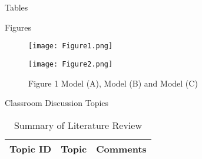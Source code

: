 \begin{frame}[t]
\begin{columns}[t]
\begin{column}{\onecolwid}
\begin{alertblock}{Tables}
\end{alertblock}
\begin{alertblock}{Figures}
\begin{figure}[H]
	\centering
	\begin{minipage}[b]{0.5\linewidth}
		\texttt{[image: Figure1.png]}
	\end{minipage}\hfill
	\begin{minipage}[b]{0.5\linewidth}
		\texttt{[image: Figure2.png]}
	\end{minipage}\hfill
	\caption{Figure 1 Model (A), Model (B) and Model (C)}
	\label{fig:Figure1}
\end{figure}
\end{alertblock}
\begin{alertblock}{Classroom Discussion Topics}

\begin{table}[H]
	\centering
	\begin{tabular}{r|p{12cm}|l}
	\hline
	Topic ID  & Topic & Comments \\
	\hline
	\hline
	\end{tabular}
	\caption{Summary of Literature Review}
\end{table} 



\end{alertblock}
\end{column}
\end{columns}
\end{frame}
